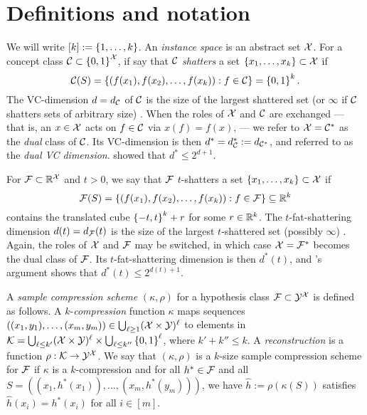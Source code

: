     

\section{Definitions and notation}
\label{sec:defnot}

We will write
$[k]:=\left\{ 1,\ldots,k \right\}$.
An {\em instance space} is an abstract set $\mathcal{X}$.
For a concept class $\mathcal{C}\subset\left\{ 0,1 \right\}^{\mathcal{X}}$,
if say that $\mathcal{C}$ {\em shatters} a set $\left\{ x_1,\ldots,x_k \right\}\subset\mathcal{X}$
if
$$\mathcal{C}(S) = \left\{  (f(x_1),f(x_2),\ldots,f(x_k)) : f\in\mathcal{C} \right\}
=
\left\{ 0,1 \right\}^k
.
$$
The VC-dimension $d=d_{\mathcal{C}}$ of $\mathcal{C}$ is the size of the largest shattered set (or $\infty$ if $\mathcal{C}$ shatters
sets of arbitrary size) \citep{MR0288823}.
When the roles of $\mathcal{X}$ and $\mathcal{C}$ are exchanged ---
that is, an $x\in\mathcal{X}$ acts on $f\in\mathcal{C}$
via
$x(f)=f(x)$, ---
we refer to $\mathcal{X}=\mathcal{C}^*$ as the {\em dual} class of $\mathcal{C}$.
Its VC-dimension is then $d^*=d^*_{\mathcal{C}}:=d_{\mathcal{C}^*}$, 
and referred to as the \emph{dual VC dimension}.
\citet{MR723955} showed that $d^*\le2^{d+1}$.

For $\mathcal{F}\subset\mathbb{R}^{\mathcal{X}}$ and $t>0$,
we say that $\mathcal{F}$ $t$-shatters
a set $\left\{ x_1,\ldots,x_k \right\}\subset\mathcal{X}$
if
$$\mathcal{F}(S) = \left\{  (f(x_1),f(x_2),\ldots,f(x_k)) : f\in\mathcal{F} \right\}\subseteq\mathbb{R}^k$$
contains the translated cube $\left\{ -t,t \right\}^k+r$ for some $r\in\mathbb{R}^k$.
The $t$-fat-shattering dimension $d(t)=d_{\mathcal{F}}(t)$
is the size of the largest $t$-shattered set (possibly $\infty$) \citep{alon97scalesensitive}.
Again, the roles of $\mathcal{X}$ and $\mathcal{F}$ may be switched,
in which case $\mathcal{X}=\mathcal{F}^*$ becomes the dual class of $\mathcal{F}$.
Its $t$-fat-shattering dimension is then $d^*(t)$,
and \citeauthor{MR723955}'s argument shows that $d^*(t) \leq 2^{d(t)+1}$.

A {\em sample compression scheme} $(\kappa,\rho)$ for a hypothesis
class $\mathcal{F}\subset\mathcal{Y}^{\mathcal{X}}$
is defined as follows.
A $k$-{\em compression} function $\kappa$
maps sequences $((x_1,y_1),\ldots,(x_m,y_m))\in\bigcup_{\ell\ge1}(\mathcal{X}\times\mathcal{Y})^\ell$
to elements in
$\mathcal{K}=\bigcup_{\ell\le k'}(\mathcal{X}\times\mathcal{Y})^\ell
\times
\bigcup_{\ell\le k''}\left\{ 0,1 \right\}^\ell$,
where $k'+k''\le k$.
A {\em reconstruction} is a function $\rho:\mathcal{K}\to\mathcal{Y}^{\mathcal{X}}$.
We say that $(\kappa,\rho)$ is a $k$-size sample compression
scheme for $\mathcal{F}$
if
$\kappa$ is a $k$-compression and
for all
$h^*\in\mathcal{F}$
and all
$S=((x_1,h^{*}(x_1)),\ldots,(x_m,h^{*}(y_m)))$,
we have
$\hat h:=\rho(\kappa(S))$
satisfies $\hat h(x_i)=h^*(x_i)$ for all $i\in[m]$.

